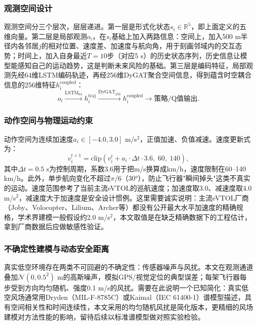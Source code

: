 \documentclass[12pt,a4paper,UTF8]{ctexart}
\begin{document}
\subsubsection{观测空间设计}

观测空间分三个层次，层层递进。第一层是形式化状态$s_i\in\mathbb{R}^5$，即上面定义的五维向量。第二层是局部观测$o_i$，在$s_i$基础上加入两路信息：空间上，加入500 m半径内各邻居$j$的相对位置、速度差、加速度与航向角，用于刻画邻域内的交互态势；时间上，加入自身最近$T=10$步（对应5 s）的历史状态序列，历史信息让模型能感知自己的运动趋势，这是判断未来风险的基础。第三层是编码特征，局部观测先经64维LSTM编码轨迹，再经256维DyGAT聚合空间信息，得到蕴含时空耦合信息的256维特征$h_i^{\text{coupled}}$：
\begin{equation}
    o_i \xrightarrow{\text{LSTM}_{64}} h_i^{\text{traj}} \xrightarrow{\text{DyGAT}_{256}} h_i^{\text{coupled}} \rightarrow \text{策略/Q值输出}.
    \label{eq:encoding_chain}
\end{equation}

\subsubsection{动作空间与物理运动约束}

动作空间为连续加速度$a_i\in[-4.0, 3.0]$ m/s$^2$，正值加速、负值减速。速度更新式为：
\begin{equation}
    v_i^{t+1} = \text{clip}\!\left(v_i^{t} + a_i \cdot \Delta t \cdot 3.6,\; 60,\; 140\right),
    \label{eq:velocity_update}
\end{equation}
其中$\Delta t=0.5$ s为控制周期，系数3.6用于把m/s换算成km/h，速度限制在60--140 km/h。此外，单步航向变化不超过$\pi/6$（30°），防止飞行器"瞬间掉头"这类不真实的运动。速度范围参考了当前主流eVTOL的巡航速度；加速度取3.0、减速度取4.0 m/s$^2$，减速度大于加速度是安全设计惯例。这里需要诚实说明：主流eVTOL厂商（Joby、Volocopter、Lilium、Archer等）都没有公开最大水平加速度的精确规格，学术界建模一般假设约2.0 m/s$^2$\cite{ref25}，本文取值是在缺乏精确数据下的工程估计，拿到厂商数据后应做敏感性验证。

\subsubsection{不确定性建模与动态安全距离}

真实低空环境存在两类不可回避的不确定性：传感器噪声与风扰。本文在观测通道叠加$\mathcal{N}(0, 0.5^2)$ m的高斯噪声，模拟GPS/视觉定位的典型误差；每架飞行器每步受到方向均匀随机、强度0.1 m/s的风扰。需要在此说明一个已知简化：真实低空风场通常用Dryden（MIL-F-8785C）\cite{ref26}或Kaimal（IEC 61400-1）\cite{ref44}谱模型描述，具有空间相关性和时间连续性，本文采用的均匀随机风扰是简化版本，更精细的风场建模对方法性能的影响，留待后续以标准谱模型做对照实验检验。
\end{document}
